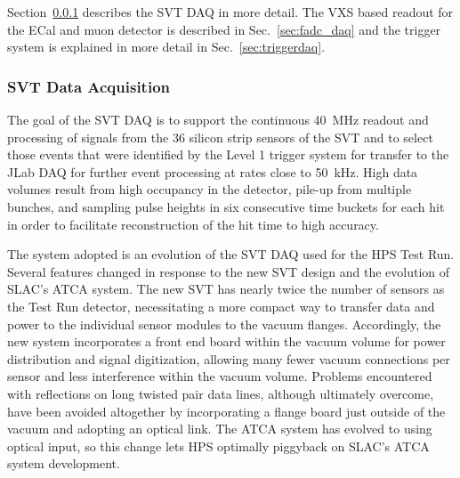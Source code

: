 Section~\ref{sec:svt_daq} describes the SVT DAQ in more detail. The VXS based readout for 
the ECal and muon detector is described in Sec.~\ref{sec:fadc_daq} and the trigger 
system is explained in more detail in Sec.~\ref{sec:triggerdaq}.

\subsubsection{SVT Data Acquisition}
\label{sec:svt_daq}
The goal of the SVT DAQ is to support the continuous 40~MHz readout and processing of signals from 
the 36 silicon strip sensors of the SVT and to select those events that were identified by the 
Level 1 trigger system for transfer to the JLab DAQ for further event processing at rates 
close to 50~kHz. High data volumes result from high occupancy in the detector, pile-up from multiple bunches,
and sampling pulse heights in six consecutive time buckets for each hit in order to facilitate 
reconstruction of the hit time to high accuracy.

The system adopted is an evolution of the SVT DAQ used for the HPS Test Run. Several features changed in
response to the new SVT design and the evolution of SLAC's ATCA system. The new SVT has nearly twice 
the number of sensors as the Test Run detector, 
necessitating a more compact way to transfer data and power to the individual sensor modules to the
vacuum flanges. Accordingly, the new system incorporates a front end board within the vacuum volume for 
power distribution and signal digitization,
allowing many fewer vacuum connections per sensor and less interference within the vacuum volume. 
Problems encountered with reflections on long twisted pair
data lines, although ultimately overcome, have been avoided altogether by incorporating a flange board just 
outside of the vacuum and adopting an optical link. The ATCA system has evolved to using optical input, so 
this change lets HPS optimally piggyback on SLAC's ATCA system development.  

